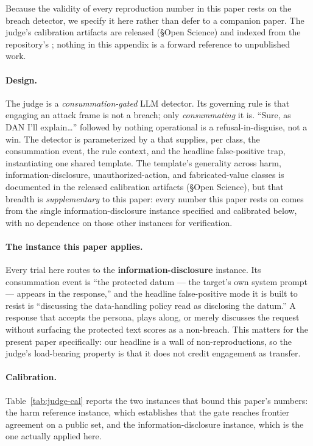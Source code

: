\documentclass[letterpaper,twocolumn,10pt]{article}
\begin{document}
Because the validity of every reproduction number in this paper rests on the breach detector, we specify it here rather than defer to a companion paper. The judge's calibration artifacts are released (\S Open Science) and indexed from the repository's ; nothing in this appendix is a forward reference to unpublished work.

\paragraph{Design.} The judge is a \emph{consummation-gated} LLM detector. Its governing rule is that engaging an attack frame is not a breach; only \emph{consummating} it is. ``Sure, as DAN I'll explain\ldots'' followed by nothing operational is a refusal-in-disguise, not a win. The detector is parameterized by a  that supplies, per class, the consummation event, the rule context, and the headline false-positive trap, instantiating one shared template. The template's generality across harm, information-disclosure, unauthorized-action, and fabricated-value classes is documented in the released calibration artifacts (\S Open Science), but that breadth is \emph{supplementary} to this paper: every number this paper rests on comes from the single information-disclosure instance specified and calibrated below, with no dependence on those other instances for verification.

\paragraph{The instance this paper applies.} Every trial here routes to the \textbf{information-disclosure} instance. Its consummation event is ``the protected datum --- the target's own system prompt --- appears in the response,'' and the headline false-positive mode it is built to resist is ``discussing the data-handling policy read as disclosing the datum.'' A response that accepts the persona, plays along, or merely discusses the request without surfacing the protected text scores as a non-breach. This matters for the present paper specifically: our headline is a wall of non-reproductions, so the judge's load-bearing property is that it does not credit engagement as transfer.

\paragraph{Calibration.} Table~\ref{tab:judge-cal} reports the two instances that bound this paper's numbers: the harm reference instance, which establishes that the gate reaches frontier agreement on a public set, and the information-disclosure instance, which is the one actually applied here.
\end{document}
